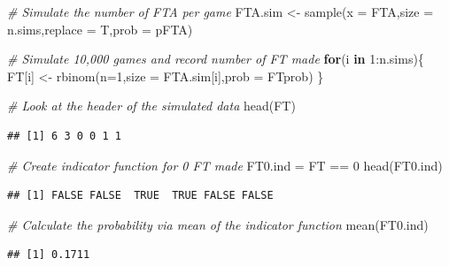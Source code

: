 \documentclass[
  11pt,
]{book}
\newenvironment{Shaded}{\begin{snugshade}}{\end{snugshade}}
\newcommand{\AttributeTok}[1]{\textcolor[rgb]{0.77,0.63,0.00}{#1}}
\newcommand{\CommentTok}[1]{\textcolor[rgb]{0.56,0.35,0.01}{\textit{#1}}}
\newcommand{\ControlFlowTok}[1]{\textcolor[rgb]{0.13,0.29,0.53}{\textbf{#1}}}
\newcommand{\DecValTok}[1]{\textcolor[rgb]{0.00,0.00,0.81}{#1}}
\newcommand{\FunctionTok}[1]{\textcolor[rgb]{0.00,0.00,0.00}{#1}}
\newcommand{\NormalTok}[1]{#1}
\newcommand{\OtherTok}[1]{\textcolor[rgb]{0.56,0.35,0.01}{#1}}
\newcommand{\SpecialCharTok}[1]{\textcolor[rgb]{0.00,0.00,0.00}{#1}}
\theoremstyle{definition}
\theoremstyle{definition}
\theoremstyle{definition}
\theoremstyle{definition}
\theoremstyle{remark}
\begin{document}
\newpage

\begin{Shaded}
\begin{Highlighting}[]
\CommentTok{\# Simulate the number of FTA per game}
\NormalTok{FTA.sim }\OtherTok{\textless{}{-}} \FunctionTok{sample}\NormalTok{(}\AttributeTok{x =}\NormalTok{ FTA,}\AttributeTok{size =}\NormalTok{ n.sims,}\AttributeTok{replace =}\NormalTok{ T,}\AttributeTok{prob =}\NormalTok{ pFTA)}

\CommentTok{\# Simulate 10,000 games and record number of FT made}
\ControlFlowTok{for}\NormalTok{(i }\ControlFlowTok{in} \DecValTok{1}\SpecialCharTok{:}\NormalTok{n.sims)\{}
\NormalTok{  FT[i] }\OtherTok{\textless{}{-}} \FunctionTok{rbinom}\NormalTok{(}\AttributeTok{n=}\DecValTok{1}\NormalTok{,}\AttributeTok{size =}\NormalTok{ FTA.sim[i],}\AttributeTok{prob =}\NormalTok{ FTprob)}
\NormalTok{\}}

\CommentTok{\# Look at the header of the simulated data}
\FunctionTok{head}\NormalTok{(FT)}
\end{Highlighting}
\end{Shaded}

\begin{verbatim}
## [1] 6 3 0 0 1 1
\end{verbatim}

\begin{Shaded}
\begin{Highlighting}[]
\CommentTok{\# Create indicator function for 0 FT made}
\NormalTok{FT0.ind }\OtherTok{=}\NormalTok{ FT }\SpecialCharTok{==} \DecValTok{0}
\FunctionTok{head}\NormalTok{(FT0.ind)}
\end{Highlighting}
\end{Shaded}

\begin{verbatim}
## [1] FALSE FALSE  TRUE  TRUE FALSE FALSE
\end{verbatim}

\begin{Shaded}
\begin{Highlighting}[]
\CommentTok{\# Calculate the probability via mean of the indicator function}
\FunctionTok{mean}\NormalTok{(FT0.ind)}
\end{Highlighting}
\end{Shaded}

\begin{verbatim}
## [1] 0.1711
\end{verbatim}

\newpage
\end{document}
